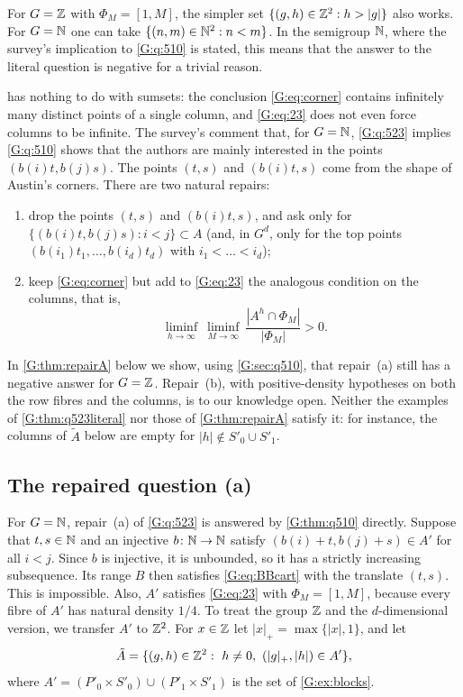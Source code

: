 
For $G=\mathbb{Z}$ with $\Phi_M=[1,M]$, the simpler set $\{(g,h)\in\mathbb{Z}^2:h>|g|\}$ also works. For
$G=\mathbb{N}$ one can take $\{(n,m)\in\mathbb{N}^2:n<m\}$. In the semigroup $\mathbb{N}$, where the survey's
implication to \cref{G:q:510} is stated, this means that the answer to the literal
question is negative for a trivial reason.

\begin{remark}\label{G:rem:formulation}
 has nothing to do with sumsets: the conclusion
\eqref{G:eq:corner} contains infinitely many distinct points of a single column, and
\eqref{G:eq:23} does not even force columns to be infinite. The survey's comment that, for
$G=\mathbb{N}$, \cref{G:q:523} implies \cref{G:q:510} shows that the authors are mainly
interested in the points $(b(i)t,b(j)s)$. The points $(t,s)$ and $(b(i)t,s)$ come from
the shape of Austin's corners. There are two natural repairs:
\begin{enumerate}[label=\textup{(\alph*)}]
\item drop the points $(t,s)$ and $(b(i)t,s)$, and ask only for
$\{(b(i)t,b(j)s):i<j\}\subset A$ (and, in $G^d$, only for the top points
$(b(i_1)t_1,\dots,b(i_d)t_d)$ with $i_1<\dots<i_d$);
\item keep \eqref{G:eq:corner} but add to \eqref{G:eq:23} the analogous condition on
the columns, that is,
\[
\liminf_{h\to\infty}\ \liminf_{M\to\infty}\ \frac{|A^h\cap\Phi_M|}{|\Phi_M|}>0 .
\]
\end{enumerate}
In \cref{G:thm:repairA} below we show, using \cref{G:sec:q510}, that repair~(a) still has
a negative answer for $G=\mathbb{Z}$. Repair~(b), with positive-density hypotheses on both the
row fibres and the columns, is to our knowledge open. Neither the
examples of \cref{G:thm:q523literal} nor those of \cref{G:thm:repairA} satisfy it: for
instance, the columns of $\tilde A$ below are empty for $|h|\notin S'_0\cup S'_1$.
\end{remark}

\subsection{The repaired question (a)}

For $G=\mathbb{N}$, repair~(a) of \cref{G:q:523} is answered by \cref{G:thm:q510} directly.
Suppose that $t,s\in\mathbb{N}$ and an injective $b\colon\mathbb{N}\to\mathbb{N}$ satisfy
$(b(i)+t,b(j)+s)\in A'$ for all $i<j$. Since $b$ is injective, it is unbounded, so it has
a strictly increasing subsequence. Its range $B$ then satisfies \eqref{G:eq:BBcart} with
the translate $(t,s)$. This is impossible. Also, $A'$ satisfies \eqref{G:eq:23} with
$\Phi_M=[1,M]$, because every fibre of $A'$ has natural density $1/4$. To treat the group
$\mathbb{Z}$ and the $d$-dimensional version, we transfer $A'$ to $\mathbb{Z}^2$. For $x\in\mathbb{Z}$ let
$|x|_+=\max\{|x|,1\}$, and let
\[
\tilde A=\{(g,h)\in\Z^2:\ h\neq0,\ (|g|_+,|h|)\in A'\},
\]
where $A'=(P'_0\times S'_0)\cup(P'_1\times S'_1)$ is the set of \cref{G:ex:blocks}.

